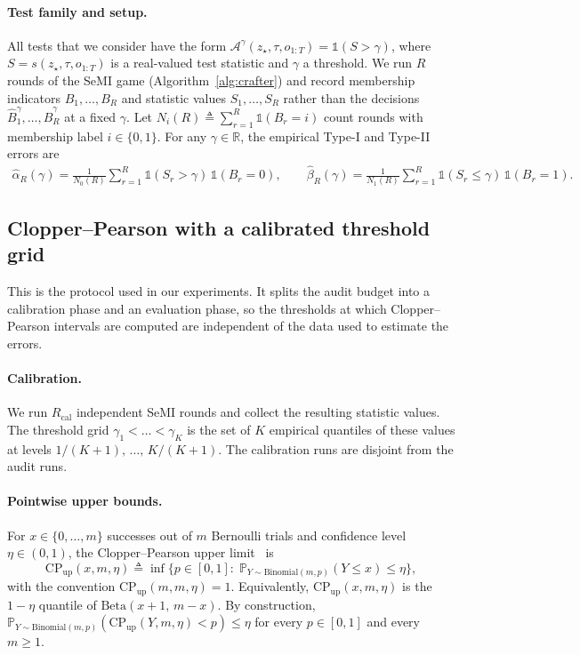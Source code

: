 \documentclass{article}
\theoremstyle{plain}
\theoremstyle{definition}
\theoremstyle{remark}
\newcommand{\RR}{\ensuremath{\mathbb{R}}}
\newcommand{\cA}{\ensuremath{\mathcal{A}}}
\renewcommand{\leq}{\leqslant}
\renewcommand{\geq}{\geqslant}
\newcommand{\bP}{\mathbb{P}}
\begin{document}
\paragraph{Test family and setup.} All tests that we consider have the form $\cA^{\gamma}(z_\star,\tau,o_{1:T}) = \mathds{1}(S > \gamma)$, where $S = s(z_\star,\tau,o_{1:T})$ is a real-valued test statistic and $\gamma$ a threshold. We run $R$ rounds of the SeMI game (Algorithm~\ref{alg:crafter}) and record membership indicators $B_1,\dots,B_R$ and statistic values $S_1,\dots,S_R$ rather than the decisions $\widehat{B}^{\gamma}_1,\dots,\widehat{B}^{\gamma}_R$ at a fixed $\gamma$. Let $N_i(R) \triangleq \sum_{r=1}^{R}\mathds{1}(B_r=i)$ count rounds with membership label $i \in \{0,1\}$. For any $\gamma \in \RR$, the empirical Type-I and Type-II errors are
\begin{align*}
    \widehat{\alpha}_{R}(\gamma) =  \frac{1}{N_0(R)}\sum_{r=1}^{R}\mathds{1}(S_r > \gamma)\,\mathds{1}(B_r = 0),
    \qquad
    \widehat{\beta}_{R}(\gamma) = \frac{1}{N_1(R)}\sum_{r=1}^{R}\mathds{1}(S_r \leq \gamma)\,\mathds{1}(B_r = 1).
\end{align*}

\subsection{Clopper--Pearson with a calibrated threshold grid}\label{app:audit-cp-grid}

This is the protocol used in our experiments. It splits the audit budget into a calibration phase and an evaluation phase, so the thresholds at which Clopper--Pearson intervals are computed are independent of the data used to estimate the errors.

\paragraph{Calibration.} We run $R_{\text{cal}}$ independent SeMI rounds and collect the resulting statistic values. The threshold grid $\gamma_1 < \dots < \gamma_K$ is the set of $K$ empirical quantiles of these values at levels $1/(K+1),\,\dots,\,K/(K+1)$. The calibration runs are disjoint from the audit runs.

\paragraph{Pointwise upper bounds.} For $x \in \{0,\dots,m\}$ successes out of $m$ Bernoulli trials and confidence level $\eta \in (0,1)$, the Clopper--Pearson upper limit~\citep{clopper1934use} is
\begin{equation}
    \mathrm{CP}_{\mathrm{up}}(x, m, \eta) \triangleq \inf\bigl\{ p \in [0,1] :\; \bP_{Y \sim \mathrm{Binomial}(m, p)}(Y \leq x) \leq \eta \bigr\}, \label{eq:cp_up}
\end{equation}
with the convention $\mathrm{CP}_{\mathrm{up}}(m, m, \eta) = 1$. Equivalently, $\mathrm{CP}_{\mathrm{up}}(x, m, \eta)$ is the $1-\eta$ quantile of $\mathrm{Beta}(x+1,\,m-x)$. By construction, $\bP_{Y \sim \mathrm{Binomial}(m,p)}(\mathrm{CP}_{\mathrm{up}}(Y, m, \eta) < p) \leq \eta$ for every $p \in [0,1]$ and every $m \geq 1$.
\end{document}
